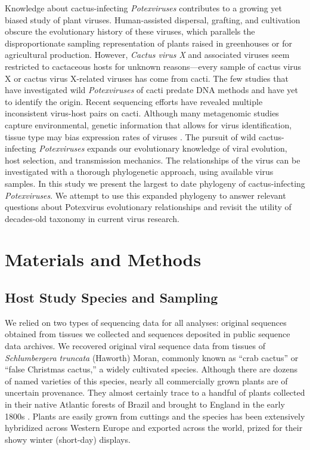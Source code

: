 \documentclass[fleqn,10pt,lineno]{wlpeerj}
\begin{document}
Knowledge about cactus-infecting \textit{Potexviruses} contributes to a growing yet biased study of plant viruses. 
Human-assisted dispersal, grafting, and cultivation obscure the evolutionary history of these viruses, which parallels the disproportionate sampling representation of plants raised in greenhouses or for agricultural production. 
However, \textit{Cactus virus X} and associated viruses seem restricted to cactaceous hosts for unknown reasons---every sample of cactus virus X or cactus virus X-related viruses has come from cacti.
The few studies that have investigated wild \textit{Potexviruses} of cacti predate DNA methods and have yet to identify the origin.
Recent sequencing efforts have revealed multiple inconsistent virus-host pairs on cacti.
Although many metagenomic studies capture environmental, genetic information that allows for virus identification, tissue type may bias expression rates of viruses \citep{lacroix2016methodological}.
The pursuit of wild cactus-infecting \textit{Potexviruses} expands our evolutionary knowledge of viral evolution, host selection, and transmission mechanics. 
The relationships of the virus can be investigated with a thorough phylogenetic approach, using available virus samples. 
In this study we present the largest to date phylogeny of cactus-infecting \textit{Potexviruses}.
We attempt to use this expanded phylogeny to answer relevant questions about Potexvirus evolutionary relationships and revisit the utility of decades-old taxonomy in current virus research. 


\section*{Materials and Methods}

\subsection*{Host Study Species and Sampling}

We relied on two types of sequencing data for all analyses: original sequences obtained from tissues we collected and sequences deposited in public sequence data archives. 
We recovered original viral sequence data from tissues of \textit{Schlumbergera truncata} (Haworth) Moran, commonly known as ``crab cactus'' or ``false Christmas cactus,'' a widely cultivated species.
Although there are dozens of named varieties of this species, nearly all commercially grown plants are of uncertain provenance. 
They almost certainly trace to a handful of plants collected in their native Atlantic forests of Brazil and brought to England in the early 1800s \citep{boyle2003}. 
Plants are easily grown from cuttings and the species has been extensively hybridized across Western Europe and exported across the world, prized for their showy winter (short-day) displays.
\end{document}
